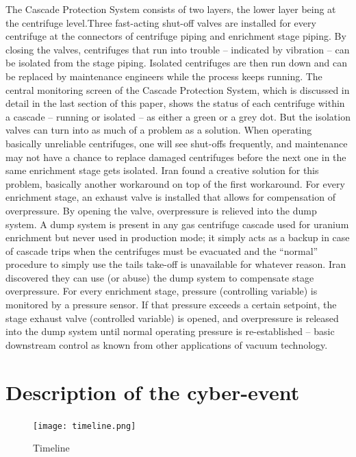 \documentclass[12pt]{article}
\begin{document}
The Cascade Protection System consists of two layers, the lower layer being at the centrifuge level.Three fast-acting shut-off valves are installed for every centrifuge at the connectors of centrifuge piping and enrichment stage piping. By closing the valves, centrifuges that run into trouble – indicated by vibration – can be isolated from the stage piping. Isolated centrifuges are then run down and can be replaced by maintenance engineers while the process keeps running. The central monitoring screen of the Cascade Protection System, which is discussed in detail in the last  section of this paper, shows the status of each centrifuge within a cascade – running or isolated – as either a green or a grey dot.
But the isolation valves can turn into as much of a problem as a solution. When operating basically unreliable centrifuges, one will see shut-offs frequently, and maintenance may not have a chance to replace damaged centrifuges before the next one in the same enrichment
stage gets isolated.
Iran found a creative solution for this problem, basically another workaround on top of the first workaround. For every enrichment stage, an exhaust valve is installed that allows for compensation of overpressure. By opening the valve, overpressure is relieved into the dump system. A dump system is present in any gas centrifuge cascade used for uranium enrichment but never used in production mode; it simply acts as a backup in case of cascade trips when the centrifuges must be evacuated and the “normal” procedure to simply use the tails take-off is unavailable for whatever reason. Iran discovered they can use (or abuse) the dump system to compensate stage overpressure. For every enrichment stage, pressure (controlling variable) is monitored by a pressure sensor. If that pressure exceeds a certain setpoint, the stage exhaust valve (controlled variable) is opened, and overpressure is released into the dump system until normal operating pressure is re-established – basic downstream control as known from other applications of vacuum technology.
    

\section{Description of the cyber-event}

    \begin{figure}[H]
    \centering
    \texttt{[image: timeline.png]}
    \caption{Timeline}
    \label{fig:timeline}
    \end{figure}
\end{document}
